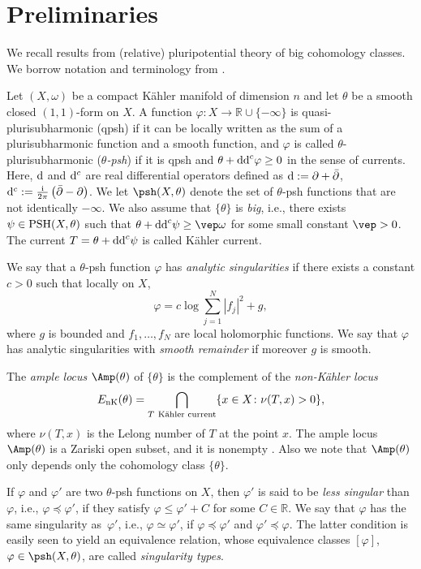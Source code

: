 \section{Preliminaries}\label{sec:prelim}

We recall results from (relative) pluripotential theory of big cohomology classes. We borrow notation and terminology from \cite{DDL6}.

Let $(X,\omega)$ be a compact K\"ahler manifold of dimension $n$ and let $\theta$ be a smooth closed $(1,1)$-form on $X$. A function $\varphi\colon X\rightarrow \mathbb{R}\cup\{-\infty\}$ is quasi-plurisubharmonic (qpsh) if it can be locally written as the sum of a plurisubharmonic function and a smooth function, and $\varphi$ is called $\theta$-plurisubharmonic ($\theta$\emph{-psh}) if it is qpsh and $\theta+{\rm dd}^c \varphi\geq 0$ in the sense of currents. Here, ${\rm d}$ and ${\rm d}^c$ are real differential operators defined as ${\rm d}:=\partial +\bar{\partial}$, ${\rm d}^c:=\frac{\rm i}{2\pi}\left(\bar{\partial}-\partial \right)$. We let $\psh(X,\theta)$ denote the set of $\theta$-psh functions that are not identically $-\infty$.
We also assume that $\{\theta\}$ is \emph{big}, i.e., there exists $\psi \in {\rm PSH}(X,\theta)$ such that $\theta +{\rm dd}^c \psi \geq \vep \omega$ for some small constant $\vep>0$. The current $T=\theta+{\rm dd}^c\psi$ is called K\"ahler current.

We say that a $\theta$-psh function $\varphi$ has \emph{analytic singularities} if there exists a constant $c>0$ such that locally on $X$,
\[
\varphi={c}\log\sum_{j=1}^{N}|f_j|^2+g,
\]
where $g$ is bounded and $f_1,\dots,f_N$ are local holomorphic functions.
We say that $\varphi$ has analytic singularities with \emph{smooth remainder} if moreover $g$ is smooth.

The \emph{ample locus} $\Amp(\theta)$ of $\{\theta\}$ is the complement of the \emph{non-K\"ahler locus}
\[E_{\rm nK}(\theta)= \bigcap_{T \ {\text{K\"ahler current}}} \{x\in X \colon \nu(T,x)>0 \},\]
where $\nu(T,x)$ is the Lelong number of $T$ at the point $x$.
The ample locus $\Amp(\theta)$ is a Zariski open subset, and it is nonempty \cite{Bou04}. Also we note that $\Amp(\theta)$ only depends only the cohomology class $\{ \theta\}$.

If $\varphi$ and $\varphi'$ are two $\theta$-psh functions on $X$, then $\varphi'$ is said to be \emph{less singular} than $\varphi$, i.e., $\varphi \preceq \varphi'$, if they satisfy $\varphi\le\varphi'+C$ for some $C\in \mathbb{R}$.
We say that $\varphi$ has the same singularity as~$\varphi'$, i.e., $\varphi \simeq \varphi'$, if $\varphi \preceq \varphi'$ and $\varphi' \preceq \varphi$. The latter condition is easily seen to yield an equivalence relation, whose equivalence classes $[\varphi]$, $\varphi \in \psh(X, \theta)$, are called \emph{singularity types}.

